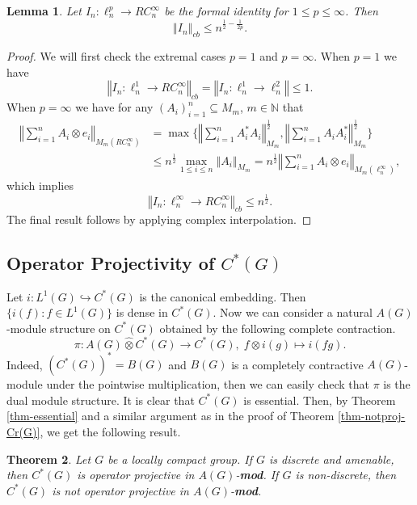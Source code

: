 \documentclass[10pt]{amsart}
\newtheorem{thm}{Theorem}
\newtheorem{lem}[thm]{Lemma}
\numberwithin{thm}{section}
\numberwithin{equation}{section}
\begin{document}
	\begin{lem}\label{lem-cb-norm-estimate}
	Let $I_n :\ell^p_n \rightarrow RC^\infty_n$ be the formal identity for $1\le p \le \infty$. Then
		$${\left\Vert{I_n}\right\Vert}_{cb} \le n^{\frac{1}{2}-\frac{1}{2p}}.$$
	\end{lem}
\begin{proof}
We will first check the extremal cases $p=1$ and $p=\infty$.
When $p=1$ we have
	$${\left\Vert{I_n :\ell^1_n \rightarrow RC^\infty_n}\right\Vert}_{cb} = {\left\Vert{I_n :\ell^1_n \rightarrow \ell^2_n}\right\Vert} \le 1.$$
When $p=\infty$ we have for any $(A_i)^n_{i=1} \subseteq M_m$, $m\in {\mathbb{N}}$ that
	\begin{align*}
	{\left\Vert{\sum^n_{i=1} A_i \otimes e_i}\right\Vert}_{M_m(RC^\infty_n)}
	& = \max \Bigg\{ {\left\Vert{\sum^n_{i=1} A^*_i A_i}\right\Vert}^{\frac{1}{2}}_{M_m}, {\left\Vert{\sum^n_{i=1} A_i A^*_i}\right\Vert}^{\frac{1}{2}}_{M_m}\Bigg\}\\
	& \le n^{\frac{1}{2}}\max_{1\le i\le n} {\left\Vert{A_i}\right\Vert}_{M_m} = n^{\frac{1}{2}}{\left\Vert{\sum^n_{i=1} A_i \otimes e_i}\right\Vert}_{M_m(\ell^\infty_n)},
	\end{align*}
which implies
	$${\left\Vert{I_n :\ell^\infty_n \rightarrow RC^\infty_n}\right\Vert}_{cb} \le n^{\frac{1}{2}}.$$
The final result follows by applying complex interpolation.
\end{proof}

\subsection{Operator Projectivity of $C^*(G)$}

Let $i : L^1(G) \hookrightarrow C^*(G)$ is the canonical embedding. Then $\{i(f) : f\in L^1(G)\}$ is dense in $C^*(G)$.
Now we can consider a natural $A(G)$-module structure on $C^*(G)$ obtained by the following complete contraction.
	$$\pi : A(G) {\widehat{\otimes}} C^*(G) \rightarrow C^*(G),\; f \otimes i(g) \mapsto i(f g).$$
Indeed, $(C^*(G))^* = B(G)$ and $B(G)$ is a completely contractive $A(G)$-module under the pointwise multiplication,
then we can easily check that $\pi$ is the dual module structure.
It is clear that $C^*(G)$ is essential.
Then, by Theorem \ref{thm-essential} and a similar argument as in the proof of Theorem \ref{thm-notproj-Cr(G)}, we get the following result.

	\begin{thm}\label{thm-fullC*}
	Let $G$ be a locally compact group. If $G$ is discrete and amenable,
	then $C^*(G)$ is operator projective in $A(G)$-{\bf mod}.
	If $G$ is non-discrete, then $C^*(G)$ is not operator projective in $A(G)$-{\bf mod}.
	\end{thm}
\end{document}
